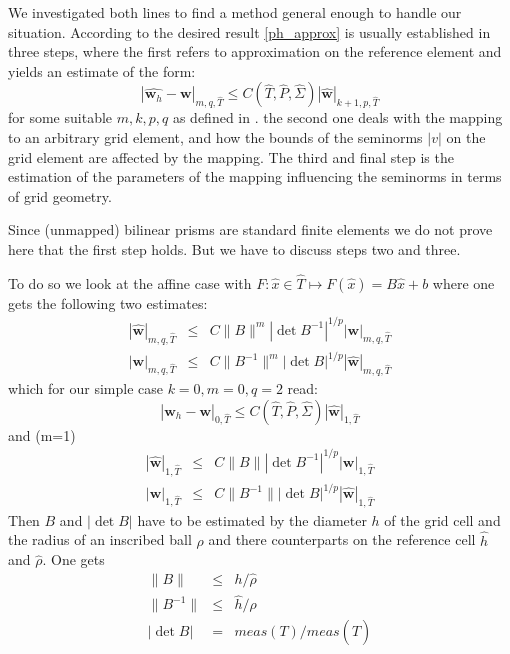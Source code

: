 \documentclass[times]{fldauth}
\newcommand{\mb}{\mathbf}
\begin{document}
We investigated both lines to find a method general enough to handle our situation.
According to \cite[p.~237]{ciarlet1994handbook} the desired result \eqref{ph_approx} is usually established in three steps, where the first 
refers to approximation on the reference element and yields an estimate of the form:
\begin{equation}
   | \hat{\mb w_h} - \mb w |_{m,q,\hat T} \le C(\hat{T}, \hat{P}, \hat{\Sigma})|\hat{\mb w}|_{k+1,p,\hat T} 
\end{equation}
for some suitable  $m,k,p,q$ as defined in \cite{ciarlet1994handbook}.
the second one deals with the mapping to an arbitrary grid element, and how the bounds of the seminorms $|v|$ on the grid element are affected by the mapping.
The third and final step is the estimation of the parameters of the mapping influencing the seminorms in terms of grid geometry. 

Since (unmapped) bilinear prisms are standard finite elements we do not prove here that the first step holds.
But we have to discuss steps two and three.

To do so we look at the affine case with $F: \hat{x} \in \hat{T} \mapsto F(\hat{x})=B\hat{x} +b $ where 
one gets the following two estimates:
\begin{eqnarray}
 | \hat{\mb w} |_{m,q,\hat T}	&\le& C\|B\|^m |\det B^{-1}|^{1/p}|\mb w|_{m,q,\hat T} \\
 | \mb w |_{m,q,\hat T} 	&\le& C\|B^{-1}\|^m |\det B|^{1/p}|\hat{\mb w}|_{m,q,\hat T} 
\end{eqnarray}
which for our simple case $k=0,m=0,q=2$ read:
\begin{equation}
   | \hat{\mb w}_h - \mb w |_{0,\hat T} \le C(\hat{T}, \hat{P}, \hat{\Sigma})|\hat{\mb w}|_{1,\hat T} 
\end{equation}
and (m=1)
\begin{eqnarray}
 | \hat{\mb w} |_{1,\hat T}	&\le& C\|B\| |\det B^{-1}|^{1/p}|\mb w|_{1,\hat T} \\
 | \mb w |_{1,\hat T} 	&\le& C\|B^{-1}\| |\det B|^{1/p}|\hat{\mb w}|_{1,\hat T} 
\end{eqnarray}
Then $B$ and $|\det B|$ have to be estimated by the diameter $h$ of the grid cell and the radius of an inscribed ball $\rho$ and there counterparts on the reference cell $\hat{h}$ and $\hat{\rho}$. 
One gets  \cite[p.~126]{ciarlet1994handbook}
\begin{eqnarray}
\|B\| 		&\le& h/\hat{\rho} \\
\|B^{-1}\| 	&\le& \hat{h}/\rho \\
|\det B| 	&=& meas(T)/meas(\hat{T})
\end{eqnarray}
\end{document}
